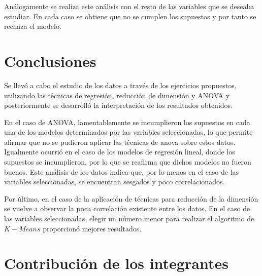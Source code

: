 \documentclass[a4paper,10pt,twocolumn]{article}
\begin{document}
Análogamente se realiza este análisis con el resto de las variables que se deseaba estudiar. En cada caso se obtiene que no se cumplen los supuestos y por tanto se rechaza el modelo.


  	




\section{Conclusiones}\label{sec:conc}

Se llevó a cabo el estudio de los datos a través de los ejercicios propuestos, utilizando las técnicas de regresión, reducción de dimensión y ANOVA y posteriormente se desarrolló la interpretación de los resultados obtenidos.

En el caso de ANOVA, lamentablemente se incumplieron los supuestos en cada una de los modelos determinados por las variables seleccionadas, lo que permite afirmar que no se pudieron aplicar las técnicas de anova sobre estos datos. Igualmente ocurrió en el caso de los modelos de regresión lineal, donde los supuestos se incumplieron, por lo que se reafirma que dichos modelos no fueron buenos. Este análisis de los datos indica que, por lo menos en el caso de las variables seleccionadas, se encuentran sesgados y poco correlacionados.

Por último, en el caso de la aplicación de técnicas para reducción de la dimensión se vuelve a observar la poca correlación existente entre los datos. En el caso de las variables seleccionadas, elegir un número menor para realizar el algoritmo de $K-Means$ proporcionó mejores resultados.


\section{Contribución de los integrantes}
\end{document}
